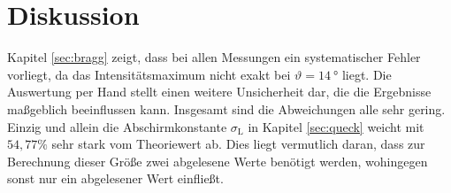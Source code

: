 \section{Diskussion}

Kapitel \ref{sec:bragg} zeigt, dass bei allen Messungen ein systematischer Fehler vorliegt, da das Intensitätsmaximum nicht exakt bei
$\vartheta = \SI{14}{°}$ liegt.
Die Auswertung per Hand stellt einen weitere Unsicherheit dar, die die Ergebnisse maßgeblich beeinflussen kann.
Insgesamt sind die Abweichungen alle sehr gering. Einzig und allein die Abschirmkonstante $\sigma_\text{L}$ in Kapitel \ref{sec:queck}
weicht mit $54,77 \%$ sehr stark vom Theoriewert ab. Dies liegt vermutlich daran, dass zur Berechnung dieser Größe zwei abgelesene Werte
benötigt werden, wohingegen sonst nur ein abgelesener Wert einfließt.
